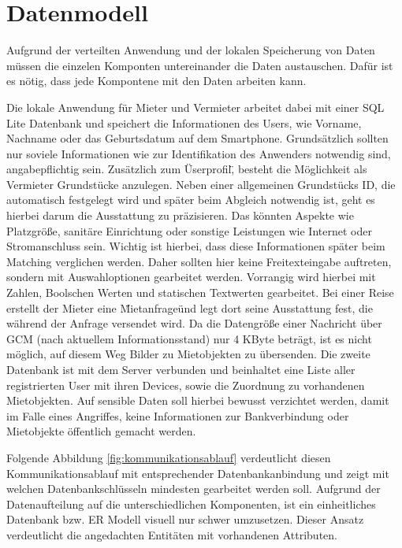
\section{Datenmodell}

Aufgrund der verteilten Anwendung und der lokalen Speicherung von Daten müssen die einzelen Komponten untereinander die Daten austauschen. Dafür ist es nötig, dass jede Kompontene mit den Daten arbeiten kann.

Die lokale Anwendung für Mieter und Vermieter arbeitet dabei mit einer SQL Lite Datenbank und speichert die Informationen des Users, wie Vorname, Nachname oder das Geburtsdatum auf dem Smartphone. Grundsätzlich sollten nur soviele Informationen wie zur Identifikation des Anwenders notwendig sind, angabepflichtig sein. Zusätzlich zum \"Userprofil\", besteht die Möglichkeit als Vermieter Grundstücke anzulegen. Neben einer allgemeinen Grundstücks ID, die automatisch festgelegt wird und später beim Abgleich notwendig ist, geht es hierbei darum die Ausstattung zu präzisieren. 
Das könnten Aspekte wie Platzgröße, sanitäre Einrichtung oder sonstige Leistungen wie Internet oder Stromanschluss sein. Wichtig ist hierbei, dass diese Informationen später beim Matching verglichen werden. Daher sollten hier keine Freitexteingabe auftreten, sondern mit Auswahloptionen gearbeitet werden. Vorrangig wird hierbei mit Zahlen, Boolschen Werten und statischen Textwerten gearbeitet. Bei einer Reise erstellt der Mieter eine \"Mietanfrage\" und legt dort seine Ausstattung fest, die während der Anfrage versendet wird. Da die Datengröße einer Nachricht über GCM (nach aktuellem Informationsstand) nur 4 KByte beträgt, ist es nicht möglich, auf diesem Weg Bilder zu Mietobjekten zu übersenden. 
Die zweite Datenbank ist mit dem Server verbunden und beinhaltet eine Liste aller registrierten User mit ihren Devices, sowie die Zuordnung zu vorhandenen Mietobjekten. Auf sensible Daten soll hierbei bewusst verzichtet werden, damit im Falle eines Angriffes, keine Informationen zur Bankverbindung oder Mietobjekte öffentlich gemacht werden.

Folgende Abbildung \ref{fig:kommunikationsablauf} verdeutlicht diesen Kommunikationsablauf mit entsprechender Datenbankanbindung und zeigt mit welchen Datenbankschlüsseln mindesten gearbeitet werden soll.
Aufgrund der Datenaufteilung auf die unterschiedlichen Komponenten, ist ein einheitliches Datenbank bzw. ER Modell visuell nur schwer umzusetzen. Dieser Ansatz verdeutlicht die angedachten Entitäten mit vorhandenen Attributen.


